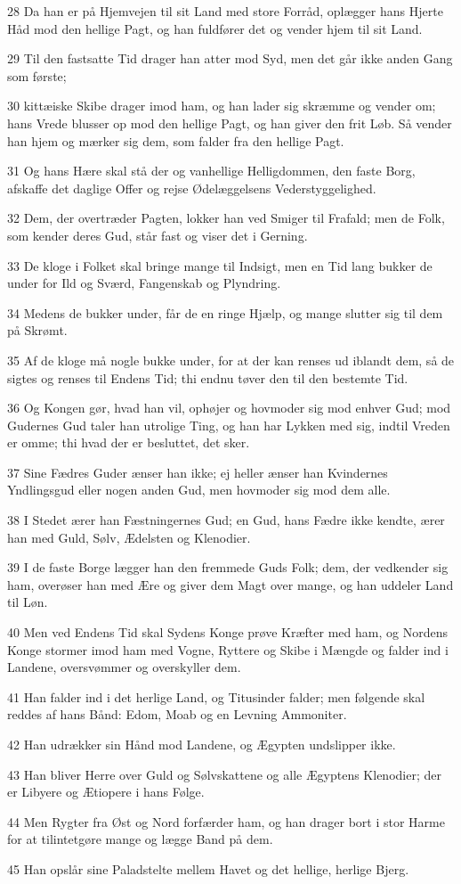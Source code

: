 \par 28 Da han er på Hjemvejen til sit Land med store Forråd, oplægger hans Hjerte Håd mod den hellige Pagt, og han fuldfører det og vender hjem til sit Land.
\par 29 Til den fastsatte Tid drager han atter mod Syd, men det går ikke anden Gang som første;
\par 30 kittæiske Skibe drager imod ham, og han lader sig skræmme og vender om; hans Vrede blusser op mod den hellige Pagt, og han giver den frit Løb. Så vender han hjem og mærker sig dem, som falder fra den hellige Pagt.
\par 31 Og hans Hære skal stå der og vanhellige Helligdommen, den faste Borg, afskaffe det daglige Offer og rejse Ødelæggelsens Vederstyggelighed.
\par 32 Dem, der overtræder Pagten, lokker han ved Smiger til Frafald; men de Folk, som kender deres Gud, står fast og viser det i Gerning.
\par 33 De kloge i Folket skal bringe mange til Indsigt, men en Tid lang bukker de under for Ild og Sværd, Fangenskab og Plyndring.
\par 34 Medens de bukker under, får de en ringe Hjælp, og mange slutter sig til dem på Skrømt.
\par 35 Af de kloge må nogle bukke under, for at der kan renses ud iblandt dem, så de sigtes og renses til Endens Tid; thi endnu tøver den til den bestemte Tid.
\par 36 Og Kongen gør, hvad han vil, ophøjer og hovmoder sig mod enhver Gud; mod Gudernes Gud taler han utrolige Ting, og han har Lykken med sig, indtil Vreden er omme; thi hvad der er besluttet, det sker.
\par 37 Sine Fædres Guder ænser han ikke; ej heller ænser han Kvindernes Yndlingsgud eller nogen anden Gud, men hovmoder sig mod dem alle.
\par 38 I Stedet ærer han Fæstningernes Gud; en Gud, hans Fædre ikke kendte, ærer han med Guld, Sølv, Ædelsten og Klenodier.
\par 39 I de faste Borge lægger han den fremmede Guds Folk; dem, der vedkender sig ham, overøser han med Ære og giver dem Magt over mange, og han uddeler Land til Løn.
\par 40 Men ved Endens Tid skal Sydens Konge prøve Kræfter med ham, og Nordens Konge stormer imod ham med Vogne, Ryttere og Skibe i Mængde og falder ind i Landene, oversvømmer og overskyller dem.
\par 41 Han falder ind i det herlige Land, og Titusinder falder; men følgende skal reddes af hans Bånd: Edom, Moab og en Levning Ammoniter.
\par 42 Han udrækker sin Hånd mod Landene, og Ægypten undslipper ikke.
\par 43 Han bliver Herre over Guld og Sølvskattene og alle Ægyptens Klenodier; der er Libyere og Ætiopere i hans Følge.
\par 44 Men Rygter fra Øst og Nord forfærder ham, og han drager bort i stor Harme for at tilintetgøre mange og lægge Band på dem.
\par 45 Han opslår sine Paladstelte mellem Havet og det hellige, herlige Bjerg.

